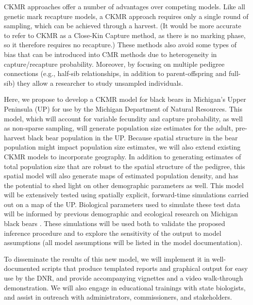 \documentclass[12pt]{article}
\newcommand{\gb}[1]{{\color{blue}{#1}}}
\begin{document}
CKMR approaches offer a number of advantages 
over competing models. 
Like all genetic mark recapture models, 
a CKMR approach requires only a single round of sampling, 
which can be achieved through a harvest.
(It would be more accurate to refer to CKMR as 
a Close-Kin Capture method, 
as there is no marking phase, 
so it therefore requires no recapture.)
These methods also avoid some types of bias 
that can be introduced into CMR methods due to 
heterogeneity in capture/recapture probability.
Moreover, by focusing on multiple pedigree connections 
(e.g., half-sib relationships, 
in addition to parent-offspring and full-sib) 
they allow a researcher to study unsampled individuals.

Here, we propose to develop a CKMR model 
for black bears in Michigan's Upper Peninsula (UP) 
for use by the Michigan Department of Natural Resources.
This model, which will account for 
variable fecundity and capture probability, 
as well as non-sparse sampling, 
will generate population size estimates 
for the adult, pre-harvest black bear population in the UP. 
Because spatial structure in the bear population might impact 
population size estimates, 
we will also extend existing CKMR models 
to incorporate geography.
In addition to generating estimates of total population size 
that are robust to the spatial structure of the pedigree, 
this spatial model will also generate maps of estimated 
population density, 
and has the potential to shed light 
on other demographic parameters as well.
This model will be extensively tested using spatially explicit,  
forward-time simulations carried out on a map of the UP. 
\gb{peter add text here.}
Biological parameters used to simulate these test data 
will be informed by previous demographic and ecological 
research on Michigan black bears \citep{Moore2014}.
These simulations will be used both to 
validate the proposed inference procedure 
and to explore the sensitivity of the output to model assumptions 
(all model assumptions will be listed in the model documentation).
\gb{hindcasting?  not sure if there is historical data...}

To disseminate the results of this new model, 
we will implement it in well-documented scripts 
that produce templated reports and graphical output
for easy use by the DNR, 
and provide accompanying vignettes 
and a video walk-through demonstration. 
We will also engage in educational trainings with state biologists, 
and assist in outreach with 
administrators, commissioners, and stakeholders.
\end{document}

